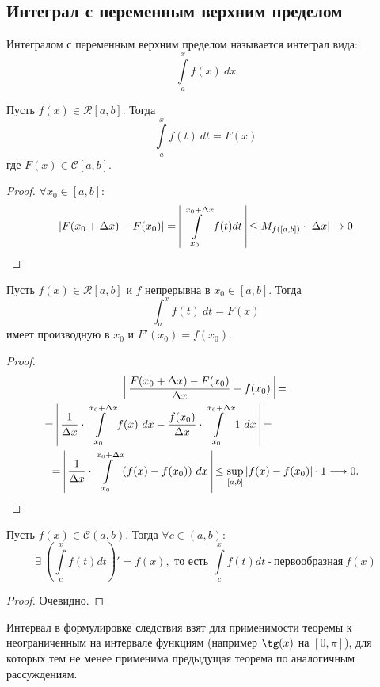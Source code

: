 \subsection{Интеграл с переменным верхним пределом}
\begin{definition}
    Интегралом с переменным верхним пределом называется интеграл вида:
    \[\int\limits_{a}^{x} f(x)\ dx\]
\end{definition} 
\begin{theorem}
    Пусть $f(x)\in \mathcal{R}[a, b]$. Тогда
    \[\int\limits_{a}^{x} f(t)\ dt = F(x)\]
    где $F(x) \in \mathcal{C}[a, b]$.
\end{theorem}
\begin{proof} 
    $\forall x_0\in [a,b]:$
    \[|F(x_0 + \Delta x) - F(x_0)| =\ \vline\int\limits_{x_0}^{x_0 + \Delta x} f(t) dt\ \vline \leq M_{f([a, b])}\cdot |\Delta x| \rightarrow 0\]
\end{proof}
\begin{theorem}
    Пусть $f(x)\in \mathcal{R}[a, b]$ и $f$ непрерывна в $x_0 \in [a, b]$. Тогда
    \[\int_{a}^{x} f(t)\ dt = F(x)\]
    имеет производную в $x_0$ и $F'(x_0) = f(x_0)$.
\end{theorem}
\begin{proof}
    \begin{multline*}
        \vline\ \frac{F(x_0 + \Delta x) - F(x_0)}{\Delta x} - f(x_0)\ \vline =\\=\ \vline\frac{1}{\Delta x}\cdot \int\limits_{x_0}^{x_0 + \Delta x} f(x)\ dx - \frac{f(x_0)}{\Delta x} \cdot \int\limits_{x_0}^{x_0 + \Delta x} 1\ dx\ \vline =\tab[3cm]\\=\ \vline\frac{1}{\Delta x}\cdot \int\limits_{x_0}^{x_0 + \Delta x} (f(x) - f(x_0))\ dx\ \vline \leq \sup \limits_{[a, b]}|f(x) - f(x_0)|\cdot 1 \longrightarrow 0.
    \end{multline*}
\end{proof}
\begin{consequense}
    Пусть $f(x) \in \mathcal{C}(a, b)$. Тогда $\forall c \in (a, b)$:
    \[\exists \ \left(\int\limits_{c}^{x} f(t)dt\right)' = f(x), \text{ то есть } \int\limits_{c}^{x} f(t)dt\ \text{-}\ \text{первообразная} \ f(x)\]
\end{consequense}
\begin{proof}
    Очевидно.
\end{proof}
\begin{comm}
    Интервал в формулировке следствия взят для применимости теоремы к неограниченным на интервале функциям (например $\tg(x)$ на $[0, \pi]$), для которых тем не менее применима предыдущая теорема по аналогичным рассуждениям.
\end{comm}
